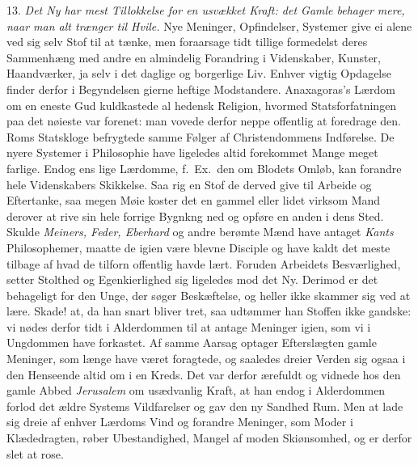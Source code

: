 \documentclass[12pt,a4paper]{article}
\newcommand{\opage}[1]{\marginnote{\footnotesize\textit{[#1]}}}
\begin{document}
13. \emph{Det Ny har mest Tillokkelse for en usvækket Kraft: det Gamle behager mere, naar
man alt trænger til Hvile.} Nye Meninger, Opfindelser, Systemer give ei alene ved sig selv
Stof til at tænke, men foraarsage tidt tillige formedelst deres Sammenhæng med andre en
almindelig Forandring i Videnskaber, Kunster, Haandværker, ja selv i det daglige og
borgerlige Liv. Enhver vigtig Opdagelse finder derfor i Begyndelsen gierne heftige
Modstandere. Anaxagoras's Lærdom om en eneste Gud kuldkastede al hedensk Religion, hvormed
Statsforfatningen paa det nøieste var forenet: man vovede derfor neppe offentlig at
foredrage den. Roms Statskloge befrygtede samme Følger af Christendommens Indførelse. De
nyere Systemer i Philosophie have ligeledes altid forekommet Mange meget farlige. Endog
ens%
\opage{211}lige Lærdomme, f.~Ex.\ den om Blodets Omløb, kan forandre hele Videnskabers Skikkelse. Saa
rig en Stof de derved give til Arbeide og Eftertanke, saa megen Møie koster det en gammel
eller lidet virksom Mand derover at rive sin hele forrige Bygnkng ned og opføre en anden i
dens Sted. Skulde \emph{Meiners, Feder, Eberhard} og andre berømte Mænd have antaget
\emph{Kants} Philosophemer, maatte de igien være blevne Disciple og have kaldt det meste
tilbage af hvad de tilforn offentlig havde lært. Foruden Arbeidets Besværlighed, setter
Stolthed og Egenkierlighed sig ligeledes mod det Ny. Derimod er det behageligt for den
Unge, der søger Beskæftelse, og heller ikke skammer sig ved at lære. Skade! at, da han
snart bliver tret, saa udtømmer han Stoffen ikke gandske: vi nødes derfor tidt i
Alderdommen til at antage Meninger igien, som vi i Ungdommen have forkastet. Af samme
Aarsag optager Efterslægten gamle Meninger, som længe have været foragtede, og saaledes
dreier Verden sig ogsaa i den Henseende altid om i en Kreds. Det var derfor ærefuldt og
vidnede hos den gamle Abbed \emph{Jerusalem} om usædvanlig Kraft, at han endog i
Alderdommen forlod det ældre Systems Vildfarelser og gav den ny Sandhed Rum. Men at lade
sig dreie af enhver Lærdoms Vind og forandre Meninger, som Moder i Klædedragten, røber
Ubestandighed, Mangel af moden Skiønsomhed, og er derfor slet at rose.
\end{document}
